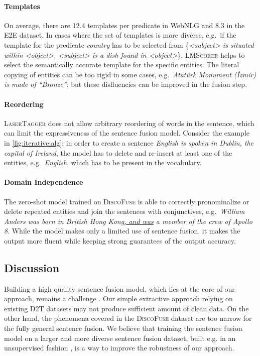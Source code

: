 \paragraph{Templates} On average, there are 12.4 templates per predicate in WebNLG and 8.3 in the E2E dataset. In cases where the set of templates is more diverse, e.g.\ if the template for the predicate \textit{country} has to be selected from \{\textit{<subject> is situated within <object>, <subject> is a dish found in <object>}\}, \textsc{LMScorer} helps to select the semantically accurate template for the specific entities. The literal copying of entities can be too rigid in some cases, e.g.\ \textit{Atatürk Monument (İzmir) is made of ``Bronze''}, but these disfluencies can be improved in the fusion step.

\paragraph{Reordering} \textsc{LaserTagger} does not allow arbitrary reordering of words in the sentence, which can limit the expressiveness of the sentence fusion model. Consider the example in \autoref{fig:iterative:alg}: in order to create a sentence \textit{English is spoken in Dublin, the capital of Ireland}, the model has to delete and re-insert at least one of the entities, e.g.\ \textit{English}, which has to be present in the vocabulary.

\paragraph{Domain Independence} The zero-shot model trained on \textsc{DiscoFuse} is able to correctly pronominalize or delete repeated entities and join the sentences with conjunctives, e.g.\ \textit{William Anders was born in British Hong Kong\underline{, and was} a member of the crew of Apollo 8}. While the model makes only a limited use of sentence fusion, it makes the output more fluent while keeping strong guarantees of the output accuracy.

\subsection{Discussion}
Building a high-quality sentence fusion model, which lies at the core of our approach, remains a challenge \cite{lebanoff2020learning}. Our simple extractive approach relying on existing D2T datasets may not produce sufficient amount of clean data. On the other hand, the phenomena covered in the \textsc{DiscoFuse} dataset are too narrow for the fully general sentence fusion. We believe that training the sentence fusion model on a larger and more diverse sentence fusion dataset, built e.g. in an unsupervised fashion \cite{lebanoff-etal-2019-scoring}, is a way to improve the robustness of our approach.

